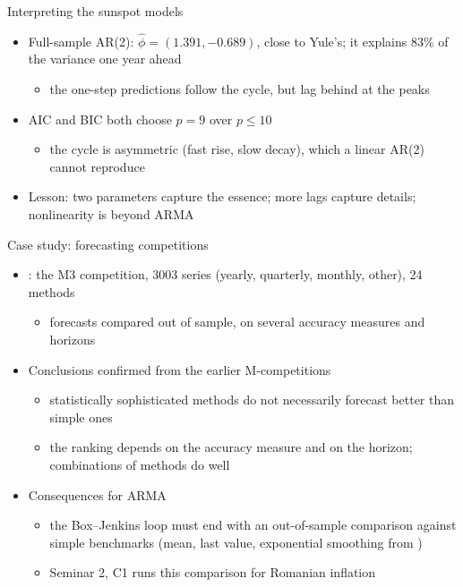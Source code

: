 \begin{frame}{Interpreting the sunspot models}
\itemsize{\small}
\begin{itemize}
    \item Full-sample AR(2): $\hat\phi = (1.391, \ensuremath{-}0.689)$, close to Yule's; it explains 83\% of the variance one year ahead
    \begin{itemize}
        \item the one-step predictions follow the cycle, but lag behind at the peaks
    \end{itemize}
    \item AIC and BIC both choose $p = 9$ over $p \le 10$
    \begin{itemize}
        \item the cycle is asymmetric (fast rise, slow decay), which a linear AR(2) cannot reproduce
    \end{itemize}
    \item Lesson: two parameters capture the essence; more lags capture details; nonlinearity is beyond ARMA
\end{itemize}
\end{frame}

\begin{frame}{Case study: forecasting competitions}
\itemsize{\small}
\begin{itemize}
    \item {}: the M3 competition, 3003 series (yearly, quarterly, monthly, other), 24 methods
    \begin{itemize}
        \item forecasts compared out of sample, on several accuracy measures and horizons
    \end{itemize}
    \item Conclusions confirmed from the earlier M-competitions
    \begin{itemize}
        \item statistically sophisticated methods do not necessarily forecast better than simple ones
        \item the ranking depends on the accuracy measure and on the horizon; combinations of methods do well
    \end{itemize}
    \item Consequences for ARMA
    \begin{itemize}
        \item the Box--Jenkins loop must end with an out-of-sample comparison against simple benchmarks (mean, last value, exponential smoothing from )
        \item Seminar 2, C1 runs this comparison for Romanian inflation
    \end{itemize}
\end{itemize}
\end{frame}

